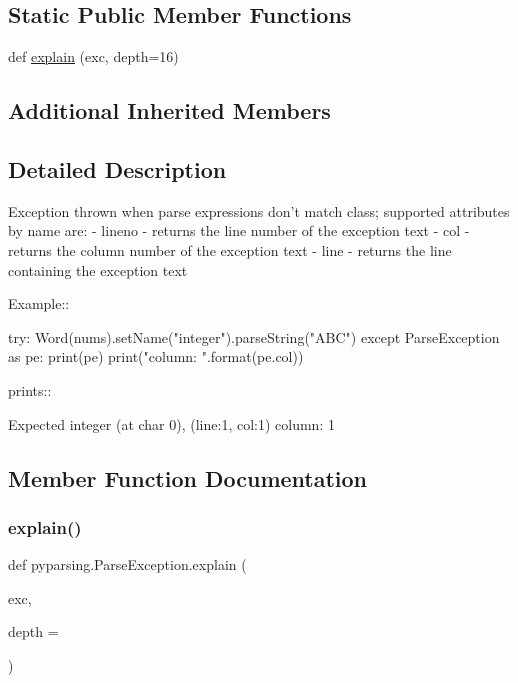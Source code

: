 \subsection*{Static Public Member Functions}
\begin{DoxyCompactItemize}
\item 
def \hyperlink{classpyparsing_1_1ParseException_ac49bcdc884e49c40d190d55953cca31e}{explain} (exc, depth=16)
\end{DoxyCompactItemize}
\subsection*{Additional Inherited Members}


\subsection{Detailed Description}
\begin{DoxyVerb}Exception thrown when parse expressions don't match class;
supported attributes by name are:
- lineno - returns the line number of the exception text
- col - returns the column number of the exception text
- line - returns the line containing the exception text

Example::

    try:
        Word(nums).setName("integer").parseString("ABC")
    except ParseException as pe:
        print(pe)
        print("column: {}".format(pe.col))

prints::

   Expected integer (at char 0), (line:1, col:1)
    column: 1\end{DoxyVerb}
 

\subsection{Member Function Documentation}
\mbox{\label{classpyparsing_1_1ParseException_ac49bcdc884e49c40d190d55953cca31e}} 
\subsubsection{\texorpdfstring{explain()}{explain()}}
{\footnotesize\ttfamily def pyparsing.\+Parse\+Exception.\+explain (\begin{DoxyParamCaption}\item[{}]{exc,  }\item[{}]{depth = {} }\end{DoxyParamCaption})\hspace{0.3cm}{\ttfamily [static]}}

